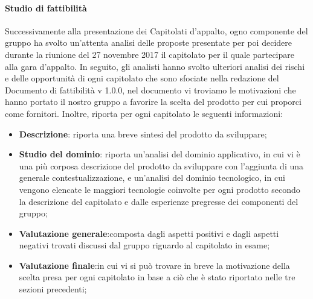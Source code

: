 \paragraph{Studio di fattibilità}\Spazio
Successivamente alla presentazione dei Capitolati d'appalto, ogno componente del gruppo ha svolto un'attenta analisi delle proposte presentate per poi decidere durante la riunione del 27 novembre 2017 il capitolato per il quale partecipare alla gara d'appalto. In seguito, gli analisti hanno svolto ulteriori analisi dei rischi e delle opportunità di ogni capitolato che sono sfociate nella redazione del Documento di fattibilità v 1.0.0, nel documento vi troviamo le motivazioni che hanno portato il nostro gruppo a favorire la scelta del prodotto per cui proporci come fornitori. Inoltre, riporta per ogni capitolato le seguenti informazioni:
\begin{itemize}
 	\item\textbf{{Descrizione}}: riporta una breve sintesi del prodotto da sviluppare;
 	\item\textbf{{Studio del dominio}}: riporta un'analisi del dominio applicativo, in cui vi è una più corposa descrizione del prodotto da sviluppare con l'aggiunta di una generale contestualizzazione, e un'analisi del dominio tecnologico, in cui vengono elencate le maggiori tecnologie coinvolte per ogni prodotto secondo la descrizione del capitolato e dalle esperienze pregresse dei componenti del gruppo;
	\item\textbf{{Valutazione generale}}:composta dagli aspetti positivi e dagli aspetti negativi trovati discussi dal gruppo riguardo al capitolato in esame;
	\item\textbf{{Valutazione finale}}:in cui vi si può trovare in breve la motivazione della scelta presa per ogni capitolato in base a ciò che è stato riportato nelle tre sezioni precedenti; 		
\end{itemize}
